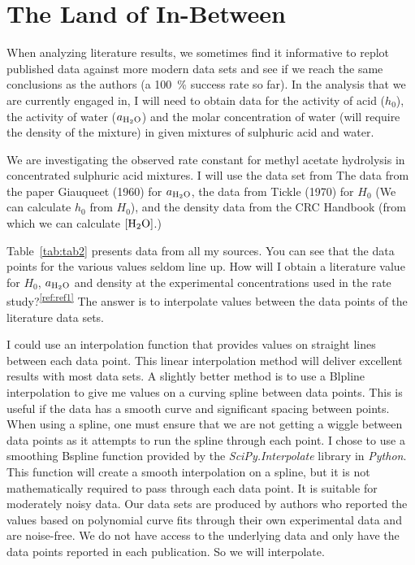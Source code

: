 \documentclass[]{tufte-handout}
\begin{document}
\newpage
\section{The Land of In-Between}

When analyzing literature results, we sometimes find it informative to replot published data against more modern data sets and see if we reach the same conclusions as the authors (a \qty{100}{\percent} success rate so far). In the analysis that we are currently engaged in, I will need to obtain data for the activity of acid ($h_0$), the activity of water ($a_{\ce{H2O}}$) and the molar concentration of water (will require the density of the mixture) in given mixtures of sulphuric acid and water. 

We are investigating the observed rate constant for methyl acetate hydrolysis in concentrated sulphuric acid mixtures.
 I will use the data set from The data from the paper Giauqueet (1960) for $a_{\ce{H2O}}$, the data from Tickle (1970) for  $H_0$ (We can calculate $h_0$ from $H_0$), and the density data from the CRC Handbook (from which we can calculate $[\ce{H2O}]$.) 
 
Table~\vref {tab:tab2} presents data from all my sources. You can see that the data points for the various values seldom line up. How will I obtain a literature value for  $H_0$, $a_{\ce{H2O}}$ and density at the experimental concentrations used in the rate study?\textsuperscript{\ref{ref:ref1}} The answer is to interpolate values between the data points of the literature data sets.

I could use an interpolation function that provides values on straight lines between each data point. This linear interpolation method will deliver excellent results with most data sets. A slightly better method is to use a Blpline interpolation to give me values on a curving spline between data points. This is useful if the data has a smooth curve and significant spacing between points. When using a spline, one must ensure that we are not getting a wiggle between data points as it attempts to run the spline through each point. I chose to use a smoothing Bspline function provided by the \textit{SciPy.Interpolate} library in \textit{Python}. This function will create a smooth interpolation on a spline, but it is not mathematically required to pass through each data point. It is suitable for moderately noisy data. Our data sets are produced by authors who reported the values based on polynomial curve fits through their own experimental data and are noise-free. We do not have access to the underlying data and only have the data points reported in each publication. So we will interpolate.
\end{document}
